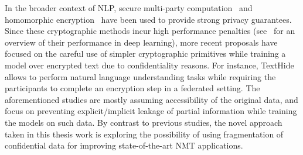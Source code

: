 In the broader context of NLP, secure multi-party computation~\parencite{feng2020securenlp} and homomorphic encryption~\parencite{al2020privft} have been used to provide strong privacy guarantees. Since these cryptographic methods incur high performance penalties (see~\parencite{riazi2019deep} for an overview of their performance in deep learning), more recent proposals have focused on the careful use of simpler cryptographic primitives while training a model over encrypted text due to confidentiality reasons. For instance, TextHide~\parencite{huang-etal-2020-texthide} allows to perform natural language understanding tasks while requiring the participants to complete an encryption step in a federated setting. 
%
The aforementioned studies are mostly assuming accessibility of the original data, and focus on preventing explicit/implicit leakage of partial information while training the models on such data. 
By contrast to previous studies, the novel approach taken in this thesis work is exploring the possibility of using fragmentation of confidential data for improving state-of-the-art NMT applications. 

